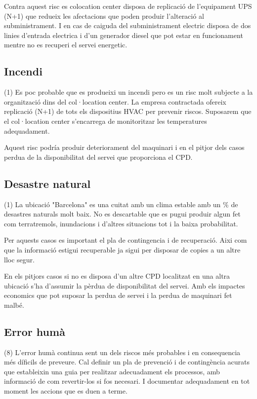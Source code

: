 \documentclass[a4paper, 11pt]{article}
\begin{document}
Contra aquest risc es colocation center disposa de replicació de l'equipament UPS (N+1) que redueix les afectacions que poden produir l'alteració al subministrament. I en cas de caiguda del subministrament electric disposa de dos linies d'entrada electrica i d'un generador diesel que pot estar en funcionament mentre no es recuperi el servei energetic.

\subsection{Incendi}
(1) Es poc probable que es produeixi un incendi pero es un risc molt subjecte a la organització dins del col·location center. La empresa contractada ofereix replicació (N+1) de tots els dispositius HVAC per prevenir riscos. Suposarem que el col·location center s'encarrega de monitoritzar les temperatures adequadament.

Aquest risc podría produir deteriorament del maquinari i en el pitjor dels casos perdua de la disponibilitat del servei que proporciona el CPD. 

\subsection{Desastre natural}
(1) La ubicació "Barcelona" es una cuitat amb un clima estable amb un \% de desastres naturals molt baix. No es descartable que es pugui produir algun fet com terratremols, inundacions i d'altres situacions tot i la baixa probabilitat.

Per aquests casos es important el pla de contingencia i de recuperació. Aixi com que la informació estigui recuperable ja sigui per disposar de copies a un altre lloc segur.

En els pitjors casos si no es disposa d'un altre CPD localitzat en una altra ubicació s'ha d'assumir la pèrdua de disponibilitat del servei. Amb els impactes economics que pot suposar la perdua de servei i la perdua de maquinari fet malbé.

\subsection{Error humà}
(8) L'error humà continua sent un dels riscos més probables i en consequencia més díficils de preveure. Cal definir un pla de prevenció i de contingència acurats que estableixin una guia per realitzar adecuadament els processos, amb informació de com revertir-los si fos necesari. I documentar adequadament en tot moment les accions que es duen a terme.
\end{document}
